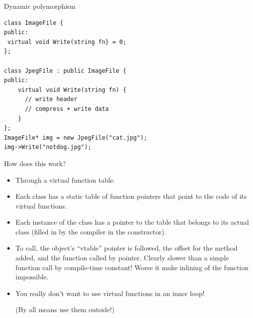 \documentclass[presentation,t]{beamer}
\begin{document}
\begin{frame}[fragile]{Dynamic polymorphism}
\begin{lstlisting}
class ImageFile {
public:
 virtual void Write(string fn} = 0;
};

class JpegFile : public ImageFile {
public:
    virtual void Write(string fn) {
      // write header
      // compress + write data
    }
};
ImageFile* img = new JpegFile("cat.jpg");
img->Write("notdog.jpg");
\end{lstlisting}
\end{frame}

\begin{frame}{How does this work?}
  \begin{itemize}
  \item Through a virtual function table.

  \item Each class has a static table of function pointers that point
    to the code of its virtual functions.

  \item Each instance of the class has a pointer to the table that
    belongs to its actual class (filled in by the compiler in the
    constructor).

  \item To call, the object's ``vtable'' pointer is followed, the
    offset for the method added, and the function called by
    pointer. Clearly slower than a simple function call by
    compile-time constant! Worse it make inlining of the function
    impossible.

  \item You really don't want to use virtual functions in an inner
    loop!

    (By all means use them outside!)
  \end{itemize}
\end{frame}
\end{document}
